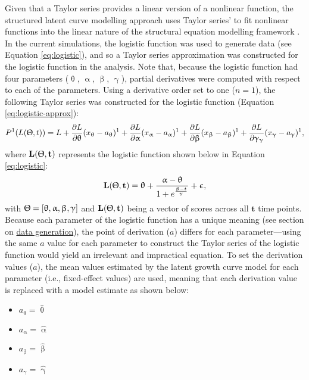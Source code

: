 \documentclass[
12pt, %
twoside,
english]{guelphthesis}
\begin{document}
Given that a Taylor series provides a linear version of a nonlinear function, the structured latent curve modelling approach uses Taylor series' to fit nonlinear functions into the linear nature of the structural equation modelling framework \autocite{browne1991,browne1993}. In the current simulations, the logistic function was used to generate data (see Equation \ref{eq:logistic}), and so a Taylor series approximation was constructed for the logistic function in the analysis. Note that, because the logistic function had four parameters (\(\uptheta\), \(\upalpha\), \(\upbeta\), \(\upgamma\)), partial derivatives were computed with respect to each of the parameters. Using a derivative order set to one
(\(n = 1\)), the following Taylor series was constructed for the logistic
function (Equation \ref{eq:logistic-approx}):
\begin{align}
 P^1(L(\Uptheta, t)) = L + \frac{\partial L}{\partial \uptheta}(x_{\uptheta}-a_{\uptheta})^1 + \frac{\partial L}{\partial \upalpha}(x_{\upalpha}-a_{\upalpha})^1 + \frac{\partial L}{\partial \upbeta}(x_{\upbeta}-a_{\upbeta})^1 + \frac{\partial L}{\partial \upgamma_{\upgamma}}(x_{\upgamma}-a_{\upgamma})^1, 
\label{eq:logistic-approx}
\end{align}
\noindent where \(\mathbf{L(\Uptheta, t)}\) represents the logistic function shown below in
Equation \ref{eq:logistic}:
\begin{align}
  \mathbf{L(\Uptheta, t)} = \uptheta + \frac{\upalpha - \uptheta}{{1 + e^\frac{\upbeta - t}{\upgamma}}} + \upepsilon, 
\label{eq:logistic}
\end{align}
\noindent with \(\mathbf{\Uptheta} = [\uptheta, \upalpha, \upbeta, \upgamma]\) and \(\mathbf{L(\Uptheta, t)}\) being a vector of scores across all \(\mathbf{t}\) time points. Because each parameter of the logistic function has a unique meaning (see section on \protect\hyperlink{data-generation}{data generation}), the point of derivation (\(a\)) differs for each parameter---using the same \(a\) value for each parameter to construct the
Taylor series of the logistic function would yield an irrelevant and impractical equation. To set the derivation values (\(a\)), the mean values estimated by the latent growth curve model for each parameter (i.e., fixed-effect values) are used, meaning that each derivation value is replaced with a model estimate as shown below:
\begin{itemize}
\tightlist
\item
  \(a_{\uptheta} = \hat{\uptheta}\)
\item
  \(a_{\upalpha} = \hat{\upalpha}\)
\item
  \(a_{\upbeta} = \hat{\upbeta}\)
\item
  \(a_{\upgamma} = \hat{\upgamma}\)
\end{itemize}
\end{document}
